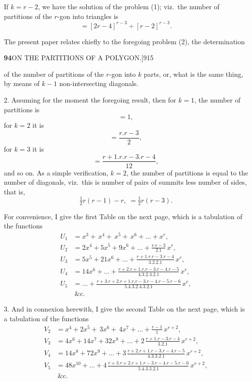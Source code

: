 \documentclass[11pt]{article}
\begin{document}
\hspace{1em} If $k=r-2$, we have the solution of the problem (1); viz.\ the
number of partitions of the $r$-gon into triangles is
\[
=[2r-4]^{r-3}\div[r-2]^{r-3}.
\]

\hspace{1em} The present paper relates chiefly to the foregoing problem (2),
the determination

\newpage
\noindent\textbf{94}\hfill ON THE PARTITIONS OF A POLYGON.\hfill[915

\smallskip
of the number of partitions of the $r$-gon into $k$ parts, or, what is the
same thing, by means of $k-1$ non-intersecting diagonals.

\hspace{1em} 2. Assuming for the moment the foregoing result, then for $k=1$,
the number of partitions is
\[
=1,
\]
for $k=2$ it is
\[
=\frac{r.r-3}{2},
\]
for $k=3$ it is
\[
=\frac{r+1.r.r-3.r-4}{12},
\]
and so on. As a simple verification, $k=2$, the number of partitions is equal
to the number of diagonals, viz.\ this is number of pairs of summits less
number of sides, that is,
\[
\tfrac{1}{2}r(r-1)-r,\;=\tfrac{1}{2}r(r-3).
\]

\hspace{1em} For convenience, I give the first Table on the next page, which
is a tabulation of the functions
\begin{align*}
U_{1} &= x^{3}+\,x^{4}+\,x^{5}+\,x^{6}+\ldots+x^{r},\\
U_{2} &= 2x^{4}+5x^{5}+9x^{6}+\ldots+\frac{r.r-3}{2.1}\,x^{r},\\
U_{3} &= 5x^{5}+21x^{6}+\ldots+\frac{r+1.r.r-3.r-4}{3.2.2.1}\,x^{r},\\
U_{4} &= 14x^{6}+\ldots+\frac{r+2.r+1.r.r-3.r-4.r-5}{4.3.2.3.2.1}\,x^{r},\\
U_{5} &= \ldots+\frac{r+3.r+2.r+1.r.r-3.r-4.r-5.r-6}{5.4.3.2.4.3.2.1}\,x^{r},\\
&\ \&\text{c.}
\end{align*}

\hspace{1em} 3. And in connexion herewith, I give the second Table on the next
page, which is a tabulation of the functions
\begin{align*}
V_{2} &= x^{4}+2x^{5}+\,3x^{6}+\,4x^{7}+\ldots+\tfrac{r-1}{1}\,x^{r+2},\\
V_{3} &= 4x^{6}+14x^{7}+32x^{8}+\ldots+2\,\tfrac{r+1.r-3.r-4}{3.2.1}\,x^{r+2},\\
V_{4} &= 14x^{8}+72x^{9}+\ldots+3\,\tfrac{r+2.r+1.r-3.r-4.r-5}{4.3.3.2.1}\,x^{r+2},\\
V_{5} &= 48x^{10}+\ldots+4\,\tfrac{r+3.r+2.r+1.r-3.r-4.r-5.r-6}{5.4.3.3.2.1}\,x^{r+2},\\
&\ \&\text{c.}
\end{align*}
\end{document}
